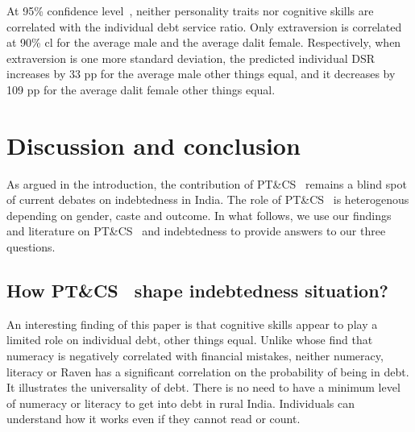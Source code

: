 \documentclass[a4paper, 12pt, onecolumn]{article}
\newcommand{\sd}{standard deviation}
\newcommand{\ote}{other things equal}
\newcommand{\cl}{confidence level}
\newcommand{\PTCS}{PT\&CS}
\begin{document}
At 95\% \cl~, neither personality traits nor cognitive skills are correlated with the individual debt service ratio.
Only extraversion is correlated at 90\% cl for the average male and the average dalit female.
Respectively, when extraversion is one more \sd, the predicted individual DSR increases by 33 pp for the average male \ote, and it decreases by 109 pp for the average dalit female \ote.




\section{Discussion and conclusion}
\label{section:discussionconclusion}

As argued in the introduction, the contribution of \PTCS~ remains a blind spot of current debates on indebtedness in India.
The role of \PTCS~ is heterogenous depending on gender, caste and outcome.
In what follows, we use our findings and literature on \PTCS~ and indebtedness to provide answers to our three questions.

	\subsection{How \PTCS~ shape indebtedness situation?}

An interesting finding of this paper is that cognitive skills appear to play a limited role on individual debt, \ote.
Unlike \cite{Agarwal2013} whose find that numeracy is negatively correlated with financial mistakes, neither numeracy, literacy or Raven has a significant correlation on the probability of being in debt.
It illustrates the universality of debt.
There is no need to have a minimum level of numeracy or literacy to get into debt in rural India.
Individuals can understand how it works even if they cannot read or count.
\end{document}
